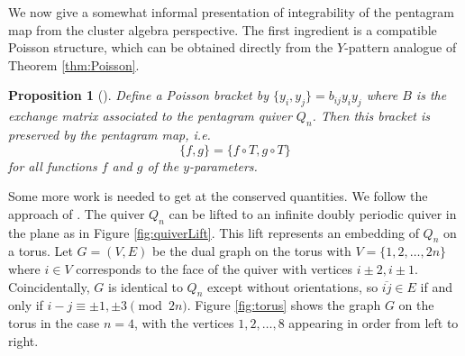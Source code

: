 \documentclass{amsart}
\newtheorem{proposition}[theorem]{Proposition}
\theoremstyle{definition}
\theoremstyle{remark}
\numberwithin{equation}{section}
\begin{document}
	We now give a somewhat informal presentation of integrability of the pentagram map from the cluster algebra perspective.  The first ingredient is a compatible Poisson structure, which can be obtained directly from the $Y$-pattern analogue of Theorem \ref{thm:Poisson}.
	
	\begin{proposition}[\cite{OST10, GSTV12}]
		Define a Poisson bracket by $\{y_i,y_j\} = b_{ij}y_iy_j$ where $B$ is the exchange matrix associated to the pentagram quiver $Q_n$.  Then this bracket is preserved by the pentagram map, i.e.
		\begin{displaymath}
			\{f,g\} = \{f\circ T, g \circ T\}
		\end{displaymath}
		for all functions $f$ and $g$ of the $y$-parameters.
	\end{proposition}
	
	Some more work is needed to get at the conserved quantities.  We follow the approach of \cite{GK13}.  The quiver $Q_n$ can be lifted to an infinite doubly periodic quiver in the plane as in Figure \ref{fig:quiverLift}.  This lift represents an embedding of $Q_n$ on a torus.  Let $G = (V,E)$ be the dual graph on the torus with $V = \{1,2,\ldots, 2n\}$ where $i \in V$ corresponds to the face of the quiver with vertices $i \pm 2, i \pm 1$.  Coincidentally, $G$ is identical to $Q_n$ except without orientations, so $\overline{ij} \in E$ if and only if $i-j \equiv \pm 1, \pm 3 \pmod{2n}$.  Figure \ref{fig:torus} shows the graph $G$ on the torus in the case $n=4$, with the vertices $1,2,\ldots, 8$ appearing in order from left to right.
	
\end{document}
